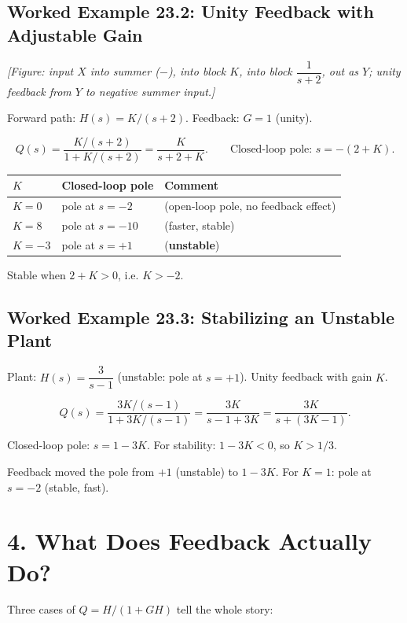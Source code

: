 \documentclass[11pt]{article}
\begin{document}
\subsection*{Worked Example 23.2: Unity Feedback with Adjustable Gain}

\textit{[Figure: input $X$ into summer ($-$), into block $K$, into block $\dfrac{1}{s+2}$, out as $Y$; unity feedback from $Y$ to negative summer input.]}

Forward path: $H(s) = K/(s+2)$. Feedback: $G = 1$ (unity).

\[Q(s) = \frac{K/(s+2)}{1 + K/(s+2)} = \frac{K}{s + 2 + K}. \qquad \text{Closed-loop pole: } s = -(2 + K).\]

\begin{center}
\begin{tabular}{|l|l|l|}
\hline
\textbf{$K$} & \textbf{Closed-loop pole} & \textbf{Comment} \\
\hline
$K = 0$ & pole at $s = -2$ & (open-loop pole, no feedback effect) \\
\hline
$K = 8$ & pole at $s = -10$ & (faster, stable) \\
\hline
$K = -3$ & pole at $s = +1$ & (\textbf{unstable}) \\
\hline
\end{tabular}
\end{center}

Stable when $2 + K > 0$, i.e. $K > -2$.

\subsection*{Worked Example 23.3: Stabilizing an Unstable Plant}

Plant: $H(s) = \dfrac{3}{s - 1}$ (unstable: pole at $s = +1$). Unity feedback with gain $K$.

\[Q(s) = \frac{3K/(s-1)}{1 + 3K/(s-1)} = \frac{3K}{s - 1 + 3K} = \frac{3K}{s + (3K - 1)}.\]

Closed-loop pole: $s = 1 - 3K$. For stability: $1 - 3K < 0$, so $K > 1/3$.

Feedback moved the pole from $+1$ (unstable) to $1 - 3K$. For $K = 1$: pole at $s = -2$ (stable, fast).

\section*{4. What Does Feedback Actually Do?}

Three cases of $Q = H/(1 + GH)$ tell the whole story:
\end{document}
